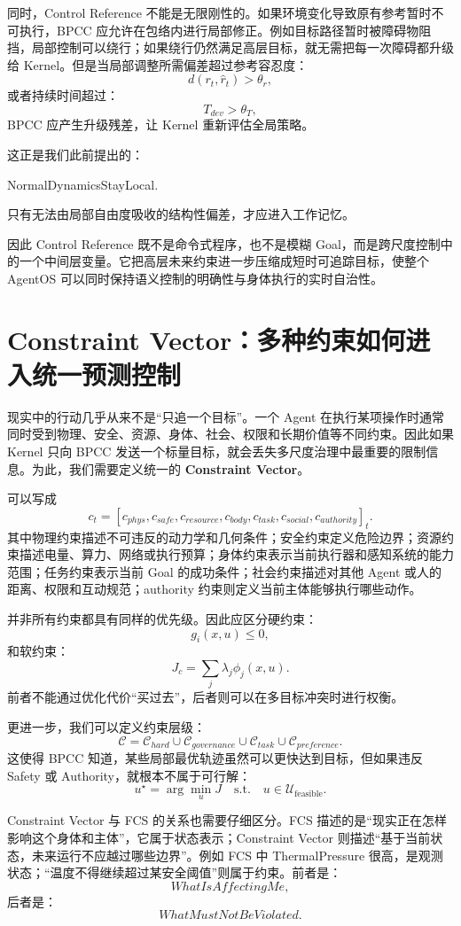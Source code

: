 同时，Control Reference 不能是无限刚性的。如果环境变化导致原有参考暂时不可执行，BPCC 应允许在包络内进行局部修正。例如目标路径暂时被障碍物阻挡，局部控制可以绕行；如果绕行仍然满足高层目标，就无需把每一次障碍都升级给 Kernel。但是当局部调整所需偏差超过参考容忍度：
\[
d(r_t,\hat r_t)>\theta_r,
\]
或者持续时间超过：
\[
T_{dev}>\theta_T,
\]
BPCC 应产生升级残差，让 Kernel 重新评估全局策略。

这正是我们此前提出的：
\begin{statementbox}
NormalDynamicsStayLocal.
\end{statementbox}
只有无法由局部自由度吸收的结构性偏差，才应进入工作记忆。

因此 Control Reference 既不是命令式程序，也不是模糊 Goal，而是跨尺度控制中的一个中间层变量。它把高层未来约束进一步压缩成短时可追踪目标，使整个 AgentOS 可以同时保持语义控制的明确性与身体执行的实时自治性。

\section{Constraint Vector：多种约束如何进入统一预测控制}

现实中的行动几乎从来不是“只追一个目标”。一个 Agent 在执行某项操作时通常同时受到物理、安全、资源、身体、社会、权限和长期价值等不同约束。因此如果 Kernel 只向 BPCC 发送一个标量目标，就会丢失多尺度治理中最重要的限制信息。为此，我们需要定义统一的 \textbf{Constraint Vector}。

可以写成
\[
c_t=
\left[
c_{phys},
c_{safe},
c_{resource},
c_{body},
c_{task},
c_{social},
c_{authority}
\right]_t.
\]
其中物理约束描述不可违反的动力学和几何条件；安全约束定义危险边界；资源约束描述电量、算力、网络或执行预算；身体约束表示当前执行器和感知系统的能力范围；任务约束表示当前 Goal 的成功条件；社会约束描述对其他 Agent 或人的距离、权限和互动规范；authority 约束则定义当前主体能够执行哪些动作。

并非所有约束都具有同样的优先级。因此应区分硬约束：
\[
g_i(x,u)\leq0,
\]
和软约束：
\[
J_c
=
\sum_j\lambda_j
\phi_j(x,u).
\]
前者不能通过优化代价“买过去”，后者则可以在多目标冲突时进行权衡。

更进一步，我们可以定义约束层级：
\[
\mathcal C=
\mathcal C_{hard}
\cup
\mathcal C_{governance}
\cup
\mathcal C_{task}
\cup
\mathcal C_{preference}.
\]
这使得 BPCC 知道，某些局部最优轨迹虽然可以更快达到目标，但如果违反 Safety 或 Authority，就根本不属于可行解：
\[
u^\star
=
\arg\min_u J
\quad
\text{s.t.}\quad
u\in\mathcal U_{\mathrm{feasible}}.
\]

Constraint Vector 与 FCS 的关系也需要仔细区分。FCS 描述的是“现实正在怎样影响这个身体和主体”，它属于状态表示；Constraint Vector 则描述“基于当前状态，未来运行不应越过哪些边界”。例如 FCS 中 ThermalPressure 很高，是观测状态；“温度不得继续超过某安全阈值”则属于约束。前者是：
\[
WhatIsAffectingMe,
\]
后者是：
\[
WhatMustNotBeViolated.
\]

